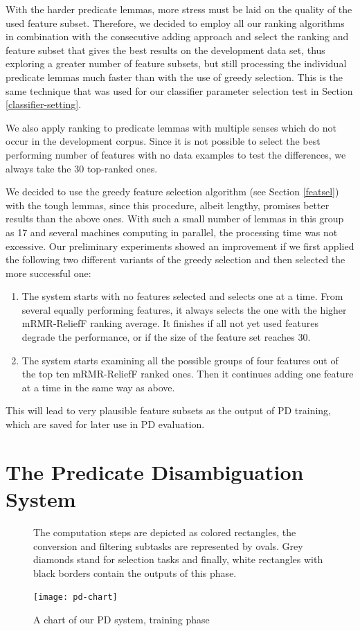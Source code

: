 \documentclass[12pt,notitlepage,a4paper]{report}
\begin{document}
With the harder predicate lemmas, more stress must be laid on the quality of the used feature subset. Therefore, we decided to employ all our ranking algorithms in combination with the consecutive adding approach and select the ranking and feature subset that gives the best results on the development data set, thus exploring a greater number of feature subsets, but still processing the individual predicate lemmas much faster than with the use of greedy selection. This is the same technique that was used for our classifier parameter selection test in Section \ref{classifier-setting}. 

We also apply ranking to predicate lemmas with multiple senses which do not occur in the development corpus. Since it is not possible to select the best performing number of features with no data examples to test the differences, we always take the 30 top-ranked ones.

We decided to use the greedy feature selection algorithm (see Section \ref{featsel}) with the tough lemmas, since this procedure, albeit lengthy, promises better results than the above ones. With such a small number of lemmas in this group as 17 and several machines computing in parallel, the processing time was not excessive. Our preliminary experiments showed an improvement if we first applied the following two different variants of the greedy selection and then selected the more successful one:
\begin{enumerate}
    \item The system starts with no features selected and selects one at a time. From several equally performing features, it always selects the one with the higher mRMR-ReliefF ranking average. It finishes if all not yet used features degrade the performance, or if the size of the feature set reaches 30.
    \item The system starts examining all the possible groups of four features out of the top ten mRMR-ReliefF ranked ones. Then it continues adding one feature at a time in the same way as above.
\end{enumerate}
This will lead to very plausible feature subsets as the output of PD training, which are saved for later use in PD evaluation.

\section{The Predicate Disambiguation System}\label{pd-overview}

\begin{figure}[p]
\caption{A chart of our PD system, training phase}\label{fig:pd-schema}
\noindent\footnotesize The computation steps are depicted as colored rectangles, the conversion and filtering subtasks are represented by ovals. Grey diamonds stand for selection tasks and finally, white rectangles with black borders contain the outputs of this phase.
\begin{center}
\texttt{[image: pd-chart]}
\end{center}
\end{figure}
\end{document}
